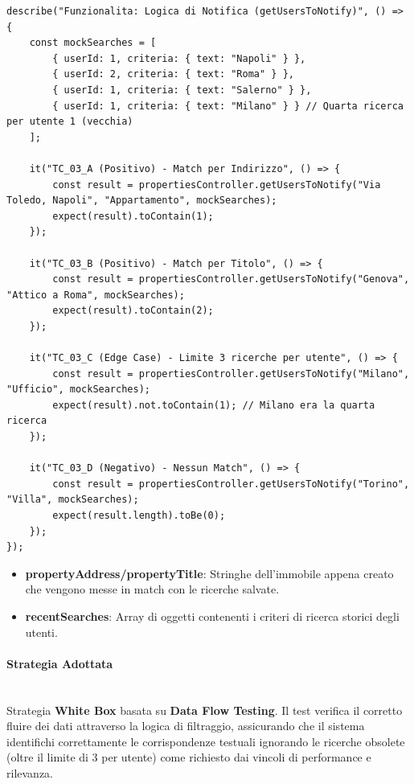 \documentclass{article}
\begin{document}
\begin{lstlisting}[caption=Unit Test della logica di business per le notifiche (getUsersToNotify)]
describe("Funzionalita: Logica di Notifica (getUsersToNotify)", () => {
    const mockSearches = [
        { userId: 1, criteria: { text: "Napoli" } },
        { userId: 2, criteria: { text: "Roma" } },
        { userId: 1, criteria: { text: "Salerno" } },
        { userId: 1, criteria: { text: "Milano" } } // Quarta ricerca per utente 1 (vecchia)
    ];

    it("TC_03_A (Positivo) - Match per Indirizzo", () => {
        const result = propertiesController.getUsersToNotify("Via Toledo, Napoli", "Appartamento", mockSearches);
        expect(result).toContain(1);
    });

    it("TC_03_B (Positivo) - Match per Titolo", () => {
        const result = propertiesController.getUsersToNotify("Genova", "Attico a Roma", mockSearches);
        expect(result).toContain(2);
    });

    it("TC_03_C (Edge Case) - Limite 3 ricerche per utente", () => {
        const result = propertiesController.getUsersToNotify("Milano", "Ufficio", mockSearches);
        expect(result).not.toContain(1); // Milano era la quarta ricerca
    });

    it("TC_03_D (Negativo) - Nessun Match", () => {
        const result = propertiesController.getUsersToNotify("Torino", "Villa", mockSearches);
        expect(result.length).toBe(0);
    });
});
\end{lstlisting}

\begin{itemize}
    \item \textbf{propertyAddress/propertyTitle}: Stringhe dell'immobile appena creato che vengono messe in match con le ricerche salvate.
    \item \textbf{recentSearches}: Array di oggetti contenenti i criteri di ricerca storici degli utenti.
\end{itemize}

\paragraph{Strategia Adottata} \mbox{} \\
Strategia \textbf{White Box} basata su \textbf{Data Flow Testing}. Il test verifica il corretto fluire dei dati attraverso la logica di filtraggio, assicurando che il sistema identifichi correttamente le corrispondenze testuali ignorando le ricerche obsolete (oltre il limite di 3 per utente) come richiesto dai vincoli di performance e rilevanza.
\end{document}
